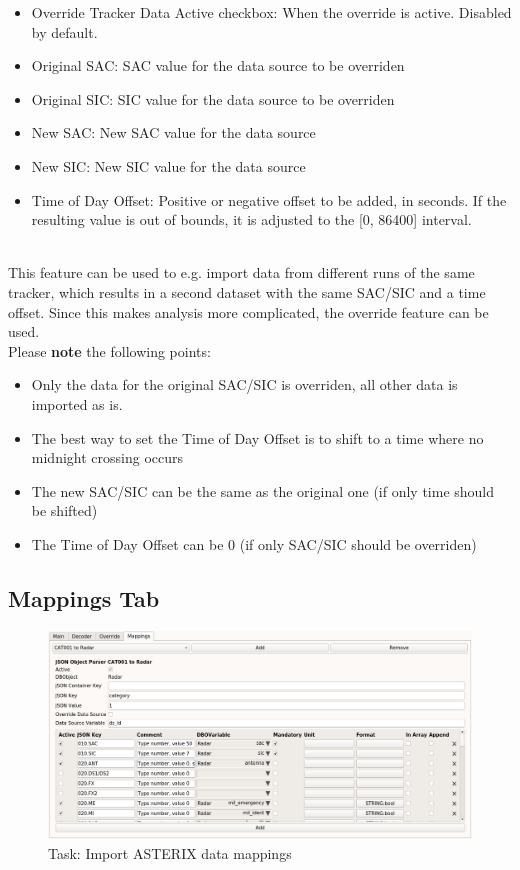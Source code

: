 \begin{itemize}  
\item Override Tracker Data Active checkbox: When the override is active. Disabled by default.
\item Original SAC: SAC value for the data source to be overriden
\item Original SIC: SIC value for the data source to be overriden
\item New SAC: New SAC value for the data source
\item New SIC: New SIC value for the data source
\item Time of Day Offset: Positive or negative offset to be added, in seconds. If the resulting value is out of bounds, it is adjusted to the [0, 86400] interval.
\end{itemize}
\ \\

This feature can be used to e.g. import data from different runs of the same tracker, which results in a second dataset with the same SAC/SIC and a time offset. Since this makes analysis more complicated, the override feature can be used. \\

Please \textbf{note} the following points:

\begin{itemize}  
\item Only the data for the original SAC/SIC is overriden, all other data is imported as is.
\item The best way to set the Time of Day Offset is to shift to a time where no midnight crossing occurs
\item The new SAC/SIC can be the same as the original one (if only time should be shifted)
\item The Time of Day Offset can be 0 (if only SAC/SIC should be overriden)
\end{itemize}

\subsection{Mappings Tab}

\begin{figure}[H]
  \hspace*{-2.5cm}
    \includegraphics[width=19cm,frame]{figures/asterix_import_data_mappings.png}
  \caption{Task: Import ASTERIX data mappings}
\end{figure}

